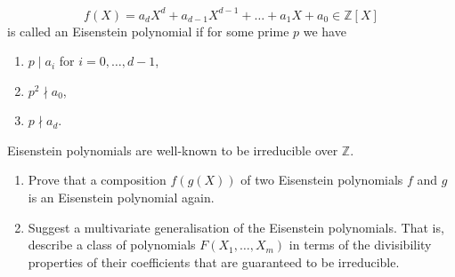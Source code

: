 \begin{exercise}
\label{applied:2014:2}
\[
f(X)=a_{d}X^{d}+a_{d-1}X^{d-1}+\dots+a_{1}X+a_{0}\in\mathbb{Z}[X]
\]
is called an Eisenstein polynomial if for some prime $p$ we have
\begin{enumerate}
\item[(i)] $p\mid a_{i}$ for $i=0,\dots,d-1$,
\item[(ii)] $p^{2}\nmid a_{0}$,
\item[(iii)] $p\nmid a_{d}$.
\end{enumerate}

Eisenstein polynomials are well-known to be irreducible over $\mathbb{Z}$.

\begin{enumerate}
\item[(i)] Prove that a composition $f(g(X))$ of two Eisenstein polynomials $f$ and $g$ is an Eisenstein polynomial again.
\item[(ii)] Suggest a multivariate generalisation of the Eisenstein polynomials. That is, describe a class of polynomials $F(X_{1},\dots,X_{m})$ in terms of the divisibility properties of their coefficients that are guaranteed to be irreducible.
\end{enumerate}
\end{exercise}

